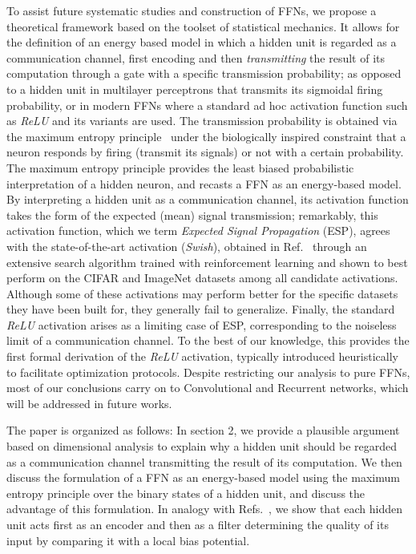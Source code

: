 \documentclass[5p]{elsarticle}
\begin{document}
To assist future systematic studies and construction of FFNs,  we propose a theoretical framework based on the toolset of statistical mechanics. It allows for the definition of an energy based model in which a hidden unit is regarded as a communication channel, first encoding and then {\it transmitting} the result of its computation through a gate with a specific transmission probability; as opposed to a hidden unit in multilayer perceptrons that transmits its sigmoidal firing probability, or in modern FFNs where a standard ad hoc activation function such as {\it ReLU} and its variants are used. The transmission probability is obtained via the maximum entropy principle~\cite{zecchina, jaynes} under the biologically inspired constraint that a neuron responds by firing (transmit its signals) or not with a certain probability. The maximum entropy principle provides the least biased probabilistic interpretation of a hidden neuron, and recasts a FFN as an energy-based model.
By interpreting a hidden unit as a communication channel, its activation function takes the form of the expected (mean) signal transmission; remarkably, this activation function, which we term {\it Expected Signal Propagation} (ESP), agrees with the state-of-the-art activation ({\it Swish}), obtained in Ref.~\cite{prajit} through an extensive search algorithm trained with reinforcement learning and shown to best perform on the CIFAR and ImageNet datasets among all candidate activations. Although some of these activations may perform better for the specific datasets they have been built for, they generally fail to generalize. Finally, the standard {\it ReLU} activation arises as a limiting case of ESP, corresponding to the noiseless limit of a communication channel. To the best of our knowledge, this provides the first formal derivation of the {\it ReLU} activation, typically introduced heuristically to facilitate optimization protocols. Despite restricting our analysis to pure FFNs, most of our conclusions carry on to Convolutional and Recurrent networks, which will be addressed in future works.


The paper is organized as follows:  In section 2, we provide a plausible argument based on dimensional analysis to explain why a hidden unit should be regarded as a communication channel transmitting the result of its computation. We then discuss the formulation of a FFN as an energy-based model using the maximum entropy principle over the binary states of a hidden unit, and discuss the advantage of this formulation. In analogy with Refs.~\cite{tishby1, tishby2}, we show that each hidden unit acts first as an encoder and then as a filter determining the quality of its input by comparing it with a local bias potential.
\end{document}
